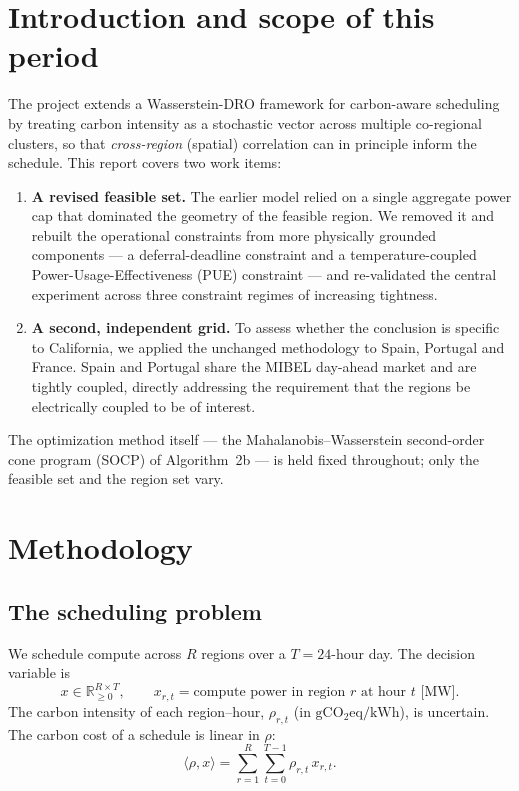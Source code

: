 \documentclass[11pt]{article}
\newcommand{\R}{\mathbb{R}}
\newcommand{\gco}{\mathrm{gCO_2eq/kWh}}
\begin{document}
\section{Introduction and scope of this period}
The project extends a Wasserstein-DRO framework for carbon-aware scheduling by treating carbon
intensity as a stochastic vector across multiple co-regional clusters, so that \emph{cross-region}
(spatial) correlation can in principle inform the schedule. This report covers two work items:
\begin{enumerate}[leftmargin=1.4em,itemsep=2pt]
  \item \textbf{A revised feasible set.} The earlier model relied on a single aggregate power cap that
  dominated the geometry of the feasible region. We removed it and rebuilt the operational constraints
  from more physically grounded components --- a deferral-deadline constraint and a temperature-coupled
  Power-Usage-Effectiveness (PUE) constraint --- and re-validated the central experiment across three
  constraint regimes of increasing tightness.
  \item \textbf{A second, independent grid.} To assess whether the conclusion is specific to
  California, we applied the unchanged methodology to Spain, Portugal and France. Spain and Portugal
  share the MIBEL day-ahead market and are tightly coupled, directly addressing the requirement that
  the regions be electrically coupled to be of interest.
\end{enumerate}
The optimization method itself --- the Mahalanobis--Wasserstein second-order cone program (SOCP) of
Algorithm~2b --- is held fixed throughout; only the feasible set and the region set vary.

\section{Methodology}

\subsection{The scheduling problem}
We schedule compute across $R$ regions over a $T=24$-hour day. The decision variable is
\[
  x \in \R^{R\times T}_{\ge 0}, \qquad x_{r,t} = \text{compute power in region $r$ at hour $t$ [MW]}.
\]
The carbon intensity of each region--hour, $\rho_{r,t}$ (in $\gco$), is uncertain. The carbon cost of a
schedule is linear in $\rho$:
\[
  \langle \rho, x\rangle = \sum_{r=1}^{R}\sum_{t=0}^{T-1} \rho_{r,t}\, x_{r,t}.
\]
\end{document}
